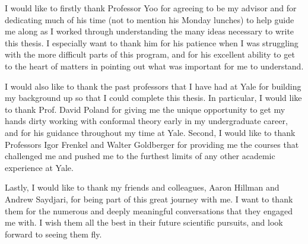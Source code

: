 I would like to firstly thank Professor Yoo for agreeing to be my advisor and for dedicating much of his time (not to mention his Monday lunches) to help guide me along as I worked through understanding the many ideas necessary to write this thesis. I especially want to thank him for his patience when I was struggling with the more difficult parts of this program, and for his excellent ability to get to the heart of matters in pointing out what was important for me to understand.

I would also like to thank the past professors that I have had at Yale for building my background up so that I could complete this thesis. In particular, I would like to thank Prof. David Poland for giving me the unique opportunity to get my hands dirty working with conformal theory early in my undergraduate career, and for his guidance throughout my time at Yale. Second, I would like to thank Professors Igor Frenkel and Walter Goldberger for providing me the courses that challenged me and pushed me to the furthest limits of any other academic experience at Yale.

Lastly, I would like to thank my friends and colleagues, Aaron Hillman and Andrew Saydjari, for being part of this great journey with me. I want to thank them for the numerous and deeply meaningful conversations that they engaged me with. I wish them all the best in their future scientific pursuits, and look forward to seeing them fly.